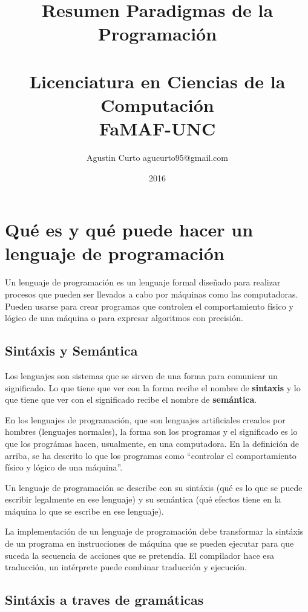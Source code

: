 \documentclass[10pt,a4paper]{report}
\title{Resumen Paradigmas de la Programación\\~\\Licenciatura en Ciencias de la 
Computación\\FaMAF-UNC}
\author{Agustin Curto     agucurto95@gmail.com}
\date{2016}
\begin{document}
\tableofcontents

\chapter{Qué es y qué puede hacer un lenguaje de programación}

    Un lenguaje de programación es un lenguaje formal diseñado para realizar procesos que pueden ser llevados a cabo 
    por máquinas como las computadoras. Pueden usarse para crear programas que controlen el comportamiento físico y 
    lógico de una máquina o para expresar algoritmos con precisión.

    \section{Sintáxis y Semántica}

        \par Los lenguajes son sistemas que se sirven de una forma para comunicar un significado. Lo que tiene que ver 
            con la forma recibe el nombre de \textbf{sintaxis} y lo que tiene que ver con el significado recibe el 
            nombre de \textbf{semántica}.

        \par En los lenguajes de programación, que son lenguajes artificiales creados por hombres (lenguajes normales),
            la forma son los programas y el significado es lo que los prográmas hacen, usualmente, en una computadora.
            En la definición de arriba, se ha descrito lo que los programas como “controlar el comportamiento físico y 
            lógico de una máquina”.

        \par Un lenguaje de programación se describe con su sintáxis (qué es lo que se puede escribir legalmente en ese
            lenguaje) y su semántica (qué efectos tiene en la máquina lo que se escribe en ese lenguaje).

        \par La implementación de un lenguaje de programación debe transformar la sintáxis de un programa en 
            instrucciones de máquina que se pueden ejecutar para que suceda la secuencia de acciones que se pretendía. 
            El compilador hace esa traducción, un intérprete puede combinar traducción y ejecución.

    \section{ Sintáxis a traves de gramáticas}
\end{document}
